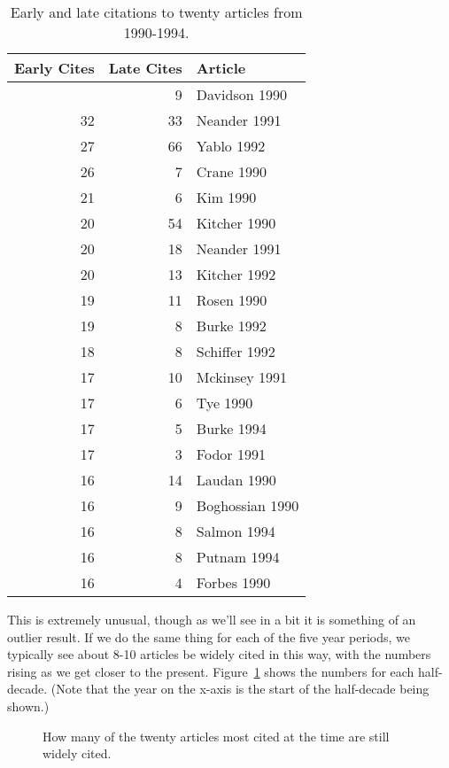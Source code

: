 \documentclass[
  10pt,
  letterpaper,
  DIV=11,
  numbers=noendperiod,
  twoside]{scrartcl}
\begin{document}
\begin{longtable}[]{@{}rrl@{}}

\caption{\label{tbl-early-1990s-expanded}Early and late citations to
twenty articles from 1990-1994.}

\tabularnewline

\toprule\noalign{}
Early Cites & Late Cites & Article \\
\midrule\noalign{}
\endhead
\bottomrule\noalign{}
\endlastfoot
33 & 9 & Davidson 1990 \\
32 & 33 & Neander 1991 \\
27 & 66 & Yablo 1992 \\
26 & 7 & Crane 1990 \\
21 & 6 & Kim 1990 \\
20 & 54 & Kitcher 1990 \\
20 & 18 & Neander 1991 \\
20 & 13 & Kitcher 1992 \\
19 & 11 & Rosen 1990 \\
19 & 8 & Burke 1992 \\
18 & 8 & Schiffer 1992 \\
17 & 10 & Mckinsey 1991 \\
17 & 6 & Tye 1990 \\
17 & 5 & Burke 1994 \\
17 & 3 & Fodor 1991 \\
16 & 14 & Laudan 1990 \\
16 & 9 & Boghossian 1990 \\
16 & 8 & Salmon 1994 \\
16 & 8 & Putnam 1994 \\
16 & 4 & Forbes 1990 \\

\end{longtable}

This is extremely unusual, though as we'll see in a bit it is something
of an outlier result. If we do the same thing for each of the five year
periods, we typically see about 8-10 articles be widely cited in this
way, with the numbers rising as we get closer to the present.
Figure~\ref{fig-still-standing} shows the numbers for each half-decade.
(Note that the year on the x-axis is the start of the half-decade being
shown.)

\begin{figure}


\caption{\label{fig-still-standing}How many of the twenty articles most
cited at the time are still widely cited.}

\end{figure}%
\end{document}
